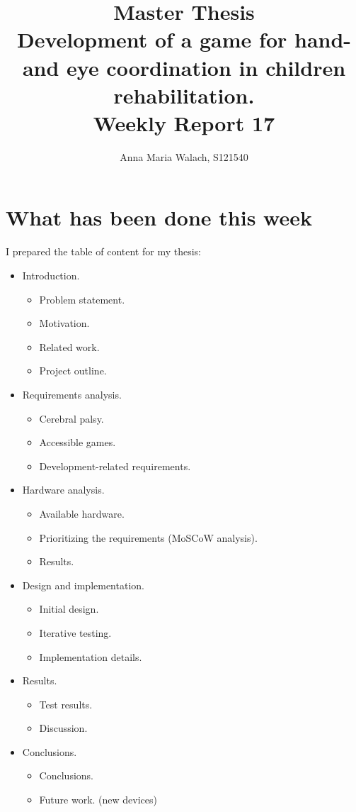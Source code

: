 \documentclass[10pt,a4paper]{article}
\title{{Master Thesis\\[0.5em]}
       {\bf \huge Development of a game for hand- and eye coordination in children rehabilitation.\\[0.5em]}
       {\bf Weekly Report 17}}
\author{Anna Maria Walach, S121540}
\begin{document}
\maketitle

\section*{What has been done this week}
I prepared the table of content for my thesis:
\begin{itemize}


\item Introduction.
  \begin{itemize}
	\item Problem statement. 
	\item  Motivation.
  	\item  Related work. 
  	\item  Project outline. 
  \end{itemize} 
\item Requirements analysis. 
\begin{itemize}
  \item Cerebral palsy. 
  \item Accessible games. 
  \item Development-related requirements.
\end{itemize}
\item Hardware analysis.
\begin{itemize}
  \item Available hardware.
  \item Prioritizing the requirements (MoSCoW analysis).
  \item Results.
  \end{itemize}
\item Design and implementation.
\begin{itemize}
  \item Initial design.
  \item Iterative testing. 
  \item Implementation details. 
  \end{itemize}
\item Results.
\begin{itemize}
  \item Test results.
  \item Discussion. 
  \end{itemize}
\item Conclusions.
\begin{itemize}
  \item Conclusions.
  \item Future work. (new devices)
  \end{itemize}


\end{itemize}
\end{document}
